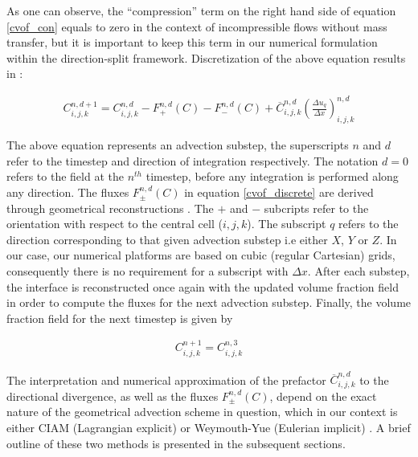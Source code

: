 As one can observe, the ``compression'' term on the right hand side of equation 
\ref{cvof_con} equals to zero in the context of incompressible flows without mass 
transfer, but it is important to keep this term in our numerical formulation within 
the direction-split framework. Discretization of the above equation results in :

\begin{align}
	C_{i,j,k}^{n,d+1} = C_{i,j,k}^{n,d} - F_{+}^{n,d}\left(C \right) - F_{-}^{n,d}\left(C \right) + \overline{C}_{i,j,k}^{n,d}\left(\frac{\Delta u_q}{\Delta x}\right)^{n,d}_{i,j,k}  
  \label{cvof_discrete}
\end{align}

The above equation represents an advection substep, the superscripts $n$ and $d$ refer to the timestep and 
direction of integration respectively. The notation $d=0$ refers to the field 
at the $n^{th}$ timestep, before any integration is performed along any direction. 
The fluxes $F_{\pm}^{n,d}(C)$ in equation \ref{cvof_discrete} are derived through geometrical reconstructions
.
The $+$ and $-$ subcripts refer to the orientation with respect to the central cell ($i,j,k$).
The subscript $q$ refers to the direction corresponding to that given advection substep 
i.e either $X$, $Y$ or $Z$. In our case, our numerical platforms are based on cubic 
(regular Cartesian) grids, consequently there is no requirement for a subscript with $\Delta x$. 
After each substep, the interface is reconstructed once again with the updated 
volume fraction field in order to compute the fluxes for the next advection substep.  
Finally, the volume fraction field for the next timestep is given by 

\begin{align}
	 C^{n+1}_{i,j,k} = C^{n,3}_{i,j,k}  
\end{align}

The interpretation and numerical approximation of the prefactor $\overline{C}_{i,j,k}^{n,d}$ 
to the directional divergence, as well as the fluxes $F_{\pm}^{n,d}(C)$, depend 
on the exact nature of the geometrical advection scheme in question, 
which in our context is either CIAM (Lagrangian explicit) or Weymouth-Yue (Eulerian implicit) 
.
A brief outline of these two methods is presented in the subsequent sections.   

